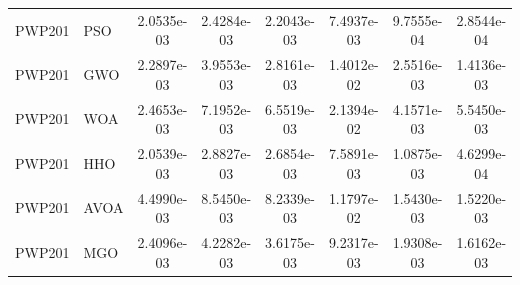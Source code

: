 \documentclass[12pt,a4paper]{article}
\begin{document}
\begin{table}[htbp]
{\begin{tabular}{llcccccc}
PWP201 & PSO & 2.0535e-03 & 2.4284e-03 & 2.2043e-03 & 7.4937e-03 & 9.7555e-04 & 2.8544e-04 \\
PWP201 & GWO & 2.2897e-03 & 3.9553e-03 & 2.8161e-03 & 1.4012e-02 & 2.5516e-03 & 1.4136e-03 \\
PWP201 & WOA & 2.4653e-03 & 7.1952e-03 & 6.5519e-03 & 2.1394e-02 & 4.1571e-03 & 5.5450e-03 \\
PWP201 & HHO & 2.0539e-03 & 2.8827e-03 & 2.6854e-03 & 7.5891e-03 & 1.0875e-03 & 4.6299e-04 \\
PWP201 & AVOA & 4.4990e-03 & 8.5450e-03 & 8.2339e-03 & 1.1797e-02 & 1.5430e-03 & 1.5220e-03 \\
PWP201 & MGO & 2.4096e-03 & 4.2282e-03 & 3.6175e-03 & 9.2317e-03 & 1.9308e-03 & 1.6162e-03 \\
\bottomrule\end{tabular}}
\end{table}
\clearpage
\end{document}
